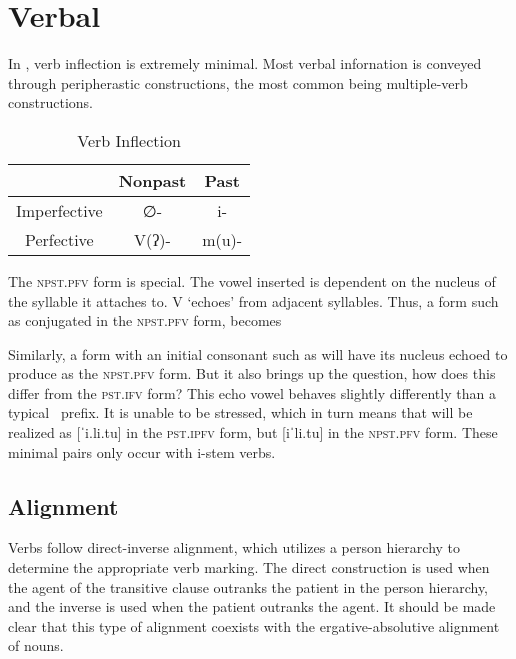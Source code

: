 \chapter{Verbal}

In \langname , verb inflection is extremely minimal.
Most verbal infornation is conveyed through peripherastic constructions, the most common being multiple-verb constructions.

\begin{table}[ht]
  \centering
  \begin{tabular}{*{3}{c}}
    \toprule
                 & Nonpast & Past  \\\midrule
    Imperfective & ∅-      & i-    \\
    Perfective   & V(ʔ)-   & m(u)- \\
    \bottomrule
  \end{tabular}
  \caption{Verb Inflection}
  \label{table:verb}
\end{table}

The \textsc{npst.pfv} form is special.
The vowel inserted is dependent on the nucleus of the syllable it attaches to.
V `echoes' from adjacent syllables.
Thus, a form such as  conjugated in the \textsc{npst.pfv} form, becomes 

Similarly, a form with an initial consonant such as  will have its nucleus echoed to produce  as the \textsc{npst.pfv} form.
But it also brings up the question, how does this differ from the \textsc{pst.ifv} form? This echo vowel behaves slightly differently than a typical \langname\ prefix.
It is unable to be stressed, which in turn means that  will be realized as [ˈi.li.tu] in the \textsc{pst.ipfv} form, but [iˈli.tu] in the \textsc{npst.pfv} form.
These minimal pairs only occur with i-stem verbs.

\section{Alignment}

Verbs follow direct-inverse alignment, which utilizes a person hierarchy to determine the appropriate verb marking.
The direct construction is used when the agent of the transitive clause outranks the patient in the person hierarchy, and the inverse is used when the patient outranks the agent.
It should be made clear that this type of alignment coexists with the ergative-absolutive alignment of nouns.

